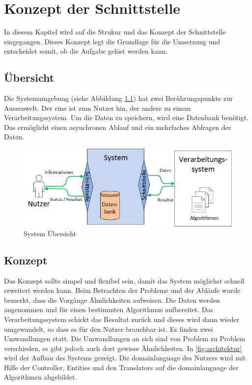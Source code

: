 %
%

\chapter{Konzept der Schnittstelle \resultAssignment{[R4]}}\label{chap.architektur}
In diesem Kapitel wird auf die Strukur und das Konzept der Schnittstelle eingegangen. Dieses Konzept legt die Grundlage für die Umsetzung und entscheidet somit, ob die 
Aufgabe gelöst werden kann.

\section{Übersicht}\label{architektur_uebersicht}
Die Systemumgebung (siehe Abbildung \ref{fig:system_scope}) hat zwei Berührungspunkte zur Aussenwelt. Der eine ist zum Nutzer hin, der andere zu einem Verarbeitungssystem. 
Um die Daten zu speichern, wird eine Datenbank benötigt. Das ermöglicht einen asynchronen Ablauf und ein mehrfaches Abfragen der Daten.
\begin{figure}[h]
\centering
\includegraphics[scale=0.8]{images/visio/Systemscope.png}
\caption[System Übersicht]{System Übersicht \selfmade{}}
\label{fig:system_scope}
\end{figure}

\section{Konzept}\label{arch_backend}
Das Konzept sollte simpel und flexibel sein, damit das System möglichst schnell erweitert werden kann. Beim Betrachten der Probleme und der Abläufe wurde bemerkt, dass die Vorgänge 
Ähnlichkeiten aufweisen. Die Daten werden angenommen und für einen bestimmten Algorithmus aufbereitet. Das Verarbeitungssystem schickt das Resultat zurück und dieses wird dann 
wieder umgewandelt, so dass es für den Nutzer brauchbar ist. Es finden zwei Umwandlungen statt. Die Umwandlungen an sich sind von Problem zu Problem verschieden, es gibt jedoch 
auch dort gewisse Ähnlichkeiten. In \autoref{fig:architektur} wird der Aufbau des Systems gezeigt. Die  \gls{domainlanguage} des Nutzers wird mit Hilfe der Controller, Entities und 
den Translators auf die \gls{domainlanguage} der Algorithmen abgebildet.

